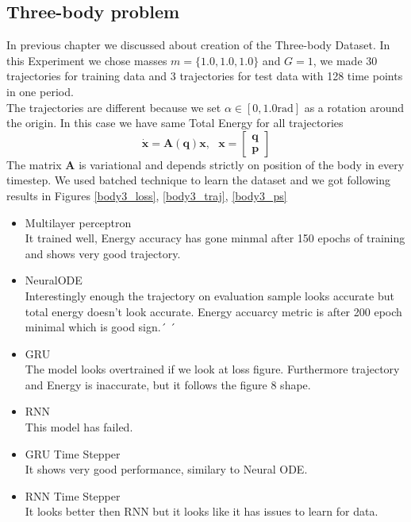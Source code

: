 \subsection{Three-body problem}
In previous chapter we discussed about creation of the Three-body Dataset.
In this Experiment we chose masses $m=\{1.0,1.0,1.0\}$ and $G=1$, we made 30 trajectories for training data and 3 trajectories for test data with 128 time points in one period.\\
The trajectories are different because we set $\alpha\in[0,1.0 \text{rad}]$ as a rotation around the origin. In this case we have same Total Energy for all trajectories\\ \begin{equation}
	\dot{\mathbf{x}} = \mathbf{A}(\mathbf{q})\mathbf{x},\text{  }\mathbf{x} = \begin{bmatrix}
		\mathbf{q}\\
		\mathbf{p}
	\end{bmatrix}
\end{equation} The matrix $\mathbf{A}$ is variational and depends strictly on position of the body in every timestep.
We used batched technique to learn the dataset and we got following results in Figures \ref{body3_loss}, \ref{body3_traj}, \ref{body3_ps}
\begin{itemize}
	\item Multilayer perceptron\\
	It trained well, Energy accuracy has gone minmal after 150 epochs of training and shows very good trajectory.

	
	\item NeuralODE\\
	Interestingly enough the trajectory on evaluation sample looks accurate but total energy doesn't look accurate. Energy accuarcy metric is after 200 epoch minimal which is good sign.´   ´

	\item GRU\\
	The model looks overtrained if we look at loss figure. Furthermore trajectory and Energy is inaccurate, but it follows the figure 8 shape. 

	\item RNN\\
	This model has failed.

	\item GRU Time Stepper\\
	It shows very good performance, similary to Neural ODE. 

	\item RNN Time Stepper\\
	It looks better then RNN but it looks like it has issues to learn for data.

\end{itemize}
